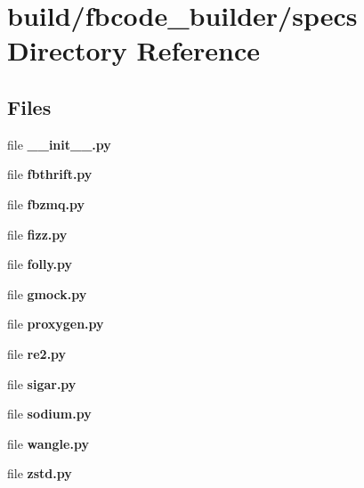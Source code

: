 \section{build/fbcode\+\_\+builder/specs Directory Reference}
\label{dir_0c645874354e390af8114197d6178551}
\subsection*{Files}
\begin{DoxyCompactItemize}
\item 
file {\bf \+\_\+\+\_\+init\+\_\+\+\_\+.\+py}
\item 
file {\bf fbthrift.\+py}
\item 
file {\bf fbzmq.\+py}
\item 
file {\bf fizz.\+py}
\item 
file {\bf folly.\+py}
\item 
file {\bf gmock.\+py}
\item 
file {\bf proxygen.\+py}
\item 
file {\bf re2.\+py}
\item 
file {\bf sigar.\+py}
\item 
file {\bf sodium.\+py}
\item 
file {\bf wangle.\+py}
\item 
file {\bf zstd.\+py}
\end{DoxyCompactItemize}
